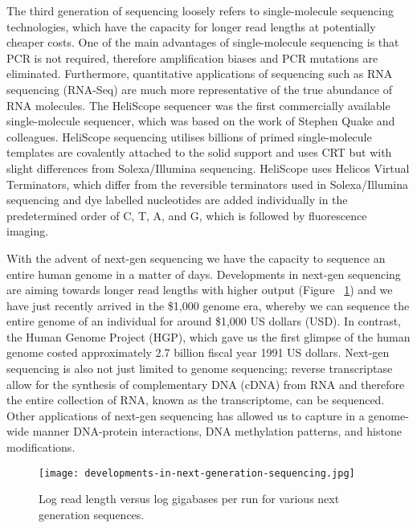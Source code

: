 The third generation of sequencing loosely refers to single-molecule sequencing technologies, which have the capacity for longer read lengths at potentially cheaper costs\cite{pmid20858600}. One of the main advantages of single-molecule sequencing is that PCR is not required, therefore amplification biases and PCR mutations are eliminated. Furthermore, quantitative applications of sequencing such as RNA sequencing (RNA-Seq) are much more representative of the true abundance of RNA molecules. The HeliScope sequencer was the first commercially available single-molecule sequencer, which was based on the work of Stephen Quake and colleagues\cite{pmid12651960}. HeliScope sequencing utilises billions of primed single-molecule templates are covalently attached to the solid support and uses CRT but with slight differences from Solexa/Illumina sequencing. HeliScope uses Helicos Virtual Terminators, which differ from the reversible terminators used in Solexa/Illumina sequencing and dye labelled nucleotides are added individually in the predetermined order of C, T, A, and G, which is followed by fluorescence imaging.

With the advent of next-gen sequencing we have the capacity to sequence an entire human genome in a matter of days. Developments in next-gen sequencing are aiming towards longer read lengths with higher output (Figure ~\ref{fig:dev_next_gen}) and we have just recently arrived in the \$1,000 genome era, whereby we can sequence the entire genome of an individual for around \$1,000 US dollars (USD). In contrast, the Human Genome Project (HGP), which gave us the first glimpse of the human genome\cite{lander2001initial} costed approximately 2.7 billion fiscal year 1991 US dollars\cite{nhgri2010cost}. Next-gen sequencing is also not just limited to genome sequencing; reverse transcriptase\cite{pmid4316300, pmid4316301} allow for the synthesis of complementary DNA (cDNA) from RNA and therefore the entire collection of RNA, known as the transcriptome, can be sequenced. Other applications of next-gen sequencing has allowed us to capture in a genome-wide manner DNA-protein interactions, DNA methylation patterns, and histone modifications\cite{applicationsofsequencing}.

\begin{figure}[h]
   \centering
   \texttt{[image: developments-in-next-generation-sequencing.jpg]}
   \caption[Developments in next generation sequencing]{Log read length versus log gigabases per run for various next generation sequences\cite{Nederbragt2012}.}
   \label{fig:dev_next_gen}
\end{figure}

